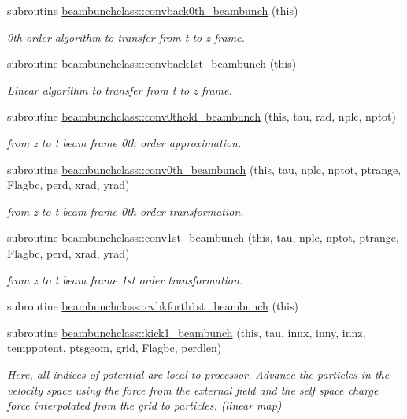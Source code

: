 \begin{DoxyCompactItemize}
subroutine \mbox{\hyperlink{namespacebeambunchclass_ad12625a90fb4a096ff15ba55f655b148}{beambunchclass\+::convback0th\+\_\+beambunch}} (this)
\begin{DoxyCompactList}\small\item\em 0th order algorithm to transfer from t to z frame. \end{DoxyCompactList}\item 
subroutine \mbox{\hyperlink{namespacebeambunchclass_a704068cca17e98c6568c1e6056d1c4d6}{beambunchclass\+::convback1st\+\_\+beambunch}} (this)
\begin{DoxyCompactList}\small\item\em Linear algorithm to transfer from t to z frame. \end{DoxyCompactList}\item 
subroutine \mbox{\hyperlink{namespacebeambunchclass_a374fdc0e530a8835113fcd674283a150}{beambunchclass\+::conv0thold\+\_\+beambunch}} (this, tau, rad, nplc, nptot)
\begin{DoxyCompactList}\small\item\em from z to t beam frame 0th order approximation. \end{DoxyCompactList}\item 
subroutine \mbox{\hyperlink{namespacebeambunchclass_ad456951b863b3dfab6eb7fa018e17230}{beambunchclass\+::conv0th\+\_\+beambunch}} (this, tau, nplc, nptot, ptrange, Flagbc, perd, xrad, yrad)
\begin{DoxyCompactList}\small\item\em from z to t beam frame 0th order transformation. \end{DoxyCompactList}\item 
subroutine \mbox{\hyperlink{namespacebeambunchclass_a0b46fd8b4c41577688761ad62175772b}{beambunchclass\+::conv1st\+\_\+beambunch}} (this, tau, nplc, nptot, ptrange, Flagbc, perd, xrad, yrad)
\begin{DoxyCompactList}\small\item\em from z to t beam frame 1st order transformation. \end{DoxyCompactList}\item 
subroutine \mbox{\hyperlink{namespacebeambunchclass_acacb775484bda2729c3da9adbbeffc53}{beambunchclass\+::cvbkforth1st\+\_\+beambunch}} (this)
\item 
subroutine \mbox{\hyperlink{namespacebeambunchclass_abf23fdc1e8ca69fe7fe8f2995fbc1bcc}{beambunchclass\+::kick1\+\_\+beambunch}} (this, tau, innx, inny, innz, temppotent, ptsgeom, grid, Flagbc, perdlen)
\begin{DoxyCompactList}\small\item\em Here, all indices of potential are local to processor. Advance the particles in the velocity space using the force from the external field and the self space charge force interpolated from the grid to particles. (linear map) \end{DoxyCompactList}\item 

\end{DoxyCompactItemize}
